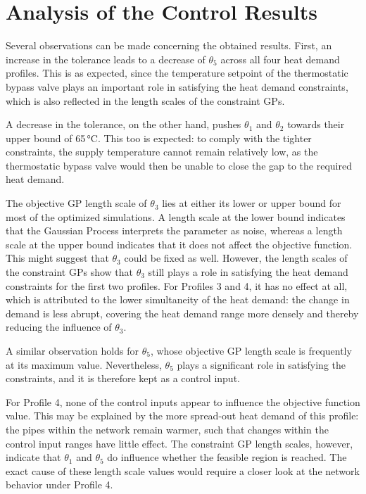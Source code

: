 \section{Analysis of the Control Results}
Several observations can be made concerning the obtained results. First, an increase in the tolerance leads to a decrease of $\theta_5$ across all four heat demand profiles. This is as expected, since the temperature setpoint of the thermostatic bypass valve plays an important role in satisfying the heat demand constraints, which is also reflected in the length scales of the constraint GPs.

A decrease in the tolerance, on the other hand, pushes $\theta_1$ and 
$\theta_2$ towards their upper bound of 65\,°C. This too is expected: to 
comply with the tighter constraints, the supply temperature cannot remain 
relatively low, as the thermostatic bypass valve would then be unable to 
close the gap to the required heat demand.

The objective GP length scale of $\theta_3$ lies at either its lower or upper bound for most of the optimized simulations. A length scale at the lower bound indicates that the Gaussian Process interprets the parameter as noise, whereas a length scale at the upper bound indicates that it does not affect the objective function. This might suggest that $\theta_3$ could be fixed as well. However, the length scales of the constraint GPs show that $\theta_3$ still plays a role in satisfying the heat demand constraints for the first two profiles. For Profiles 3 and 4, it has no effect at all, which is attributed to the lower simultaneity of the heat demand: the change in demand is less abrupt, covering the heat demand range more densely and thereby reducing the influence 
of $\theta_3$.

A similar observation holds for $\theta_5$, whose objective GP length scale is frequently at its maximum value. Nevertheless, $\theta_5$ plays a significant role in satisfying the constraints, and it is therefore kept as a control input.

For Profile 4, none of the control inputs appear to influence the 
objective function value. This may be explained by the more spread-out heat demand of this profile: the pipes within the network remain warmer, such that changes within the control input ranges have little effect. The constraint GP length scales, however, indicate that $\theta_1$ and $\theta_5$ do influence whether the feasible region is reached. The exact cause of these length scale values would require a closer look at the network behavior under Profile 4.


